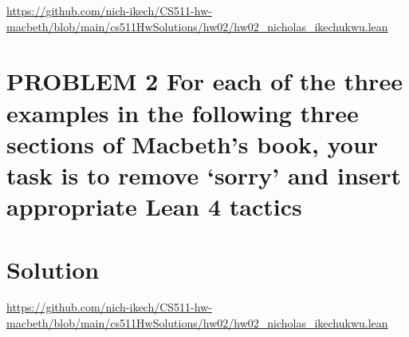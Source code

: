 \documentclass{article}
\begin{document}
\url{https://github.com/nich-ikech/CS511-hw-macbeth/blob/main/cs511HwSolutions/hw02/hw02_nicholas_ikechukwu.lean}

\newpage

\section*{PROBLEM 2 For each of the three examples in the following three sections of Macbeth’s book,
your task is to remove ‘sorry’ and insert appropriate Lean 4 tactics}
\section*{Solution}

\url{https://github.com/nich-ikech/CS511-hw-macbeth/blob/main/cs511HwSolutions/hw02/hw02_nicholas_ikechukwu.lean}
\end{document}
